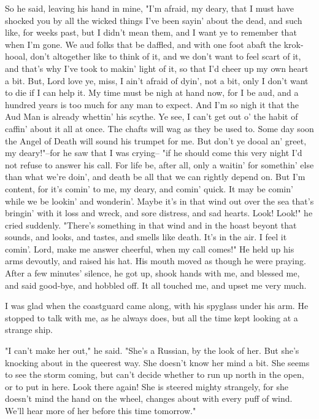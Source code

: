 So he said, leaving his hand in mine, "I'm afraid, my deary, that I must have shocked you by all the wicked things I've been sayin' about the dead, and such like, for weeks past, but I didn't mean them, and I want ye to remember that when I'm gone. We aud folks that be daffled, and with one foot abaft the krok-hooal, don't altogether like to think of it, and we don't want to feel scart of it, and that's why I've took to makin' light of it, so that I'd cheer up my own heart a bit. But, Lord love ye, miss, I ain't afraid of dyin', not a bit, only I don't want to die if I can help it. My time must be nigh at hand now, for I be aud, and a hundred years is too much for any man to expect. And I'm so nigh it that the Aud Man is already whettin' his scythe. Ye see, I can't get out o' the habit of caffin' about it all at once. The chafts will wag as they be used to. Some day soon the Angel of Death will sound his trumpet for me. But don't ye dooal an' greet, my deary!"--for he saw that I was crying-- "if he should come this very night I'd not refuse to answer his call. For life be, after all, only a waitin' for somethin' else than what we're doin', and death be all that we can rightly depend on. But I'm content, for it's comin' to me, my deary, and comin' quick. It may be comin' while we be lookin' and wonderin'. Maybe it's in that wind out over the sea that's bringin' with it loss and wreck, and sore distress, and sad hearts. Look! Look!" he cried suddenly. "There's something in that wind and in the hoast beyont that sounds, and looks, and tastes, and smells like death. It's in the air. I feel it comin'. Lord, make me answer cheerful, when my call comes!" He held up his arms devoutly, and raised his hat. His mouth moved as though he were praying. After a few minutes' silence, he got up, shook hands with me, and blessed me, and said good-bye, and hobbled off. It all touched me, and upset me very much. 

I was glad when the coastguard came along, with his spyglass under his arm. He stopped to talk with me, as he always does, but all the time kept looking at a strange ship. 

"I can't make her out," he said. "She's a Russian, by the look of her. But she's knocking about in the queerest way. She doesn't know her mind a bit. She seems to see the storm coming, but can't decide whether to run up north in the open, or to put in here. Look there again! She is steered mighty strangely, for she doesn't mind the hand on the wheel, changes about with every puff of wind. We'll hear more of her before this time tomorrow." 
